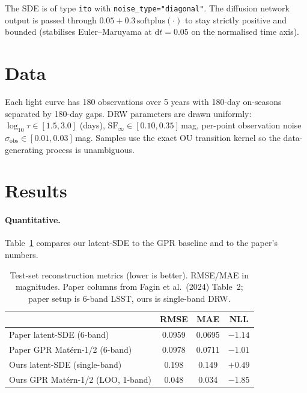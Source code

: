 \documentclass[11pt]{article}
\begin{document}
The SDE is of type \texttt{ito} with \texttt{noise\_type="diagonal"}.
The diffusion network output is passed through $0.05 + 0.3\,\mathrm{softplus}(\cdot)$ to stay strictly
positive and bounded (stabilises Euler--Maruyama at $\mathrm{d}t=0.05$ on the normalised time axis).

\section{Data}
Each light curve has 180 observations over 5 years with 180-day on-seasons separated by 180-day
gaps. DRW parameters are drawn uniformly: $\log_{10}\tau \in [1.5,3.0]$ (days), $\mathrm{SF}_\infty
\in [0.10,0.35]$\,mag, per-point observation noise $\sigma_{\mathrm{obs}}\in[0.01,0.03]$\,mag.
Samples use the exact OU transition kernel so the data-generating process is unambiguous.

\section{Results}
\paragraph{Quantitative.} Table~\ref{tab:results} compares our latent-SDE to the GPR baseline and to
the paper's numbers.

\begin{table}[h]
\centering
\caption{Test-set reconstruction metrics (lower is better). RMSE/MAE in magnitudes.
Paper columns from Fagin et al.\ (2024) Table~2; paper setup is 6-band LSST, ours is single-band DRW.}
\label{tab:results}
\begin{tabular}{lccc}
\toprule
 & RMSE & MAE & NLL \\
\midrule
Paper latent-SDE (6-band)           & 0.0959 & 0.0695 & $-1.14$ \\
Paper GPR Mat\'ern-1/2  (6-band)    & 0.0978 & 0.0711 & $-1.01$ \\
\midrule
Ours latent-SDE (single-band)       & 0.198  & 0.149  & $+0.49$ \\
Ours GPR Mat\'ern-1/2 (LOO, 1-band) & 0.048  & 0.034  & $-1.85$ \\
\bottomrule
\end{tabular}
\end{table}
\end{document}
